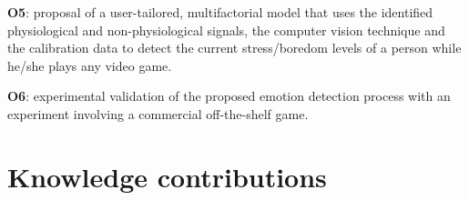 \textbf{O5}: proposal of a user-tailored, multifactorial model that uses the identified physiological and non-physiological signals, the computer vision technique and the calibration data to detect the current stress/boredom levels of a person while he/she plays any video game.

\textbf{O6}: experimental validation of the proposed emotion detection process with an experiment involving a commercial off-the-shelf game.




\section{Knowledge contributions}
\label{sec:contributions}

